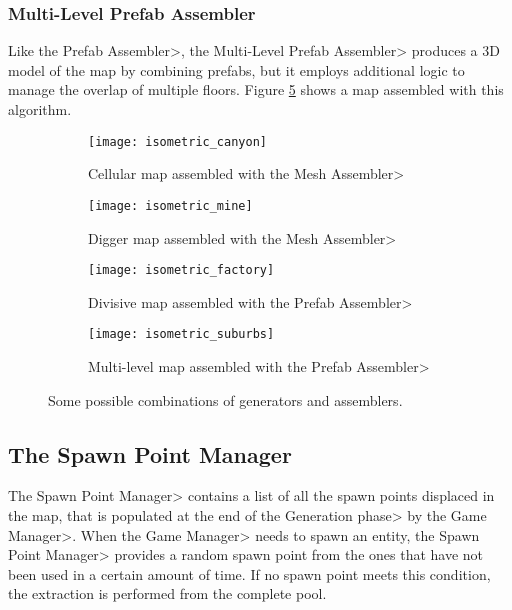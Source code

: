 
\subsubsection{Multi-Level Prefab Assembler}

Like the \<Prefab Assembler>, the \<Multi-Level Prefab Assembler> produces a 3D model of the map by combining prefabs, but it employs additional logic to manage the overlap of multiple floors. Figure \ref{fig:multi_assembled} shows a map assembled with this algorithm.

\begin{figure}
\centering
\begin{subfigure}[t]{0.48\linewidth}
\texttt{[image: isometric\_canyon]}
\caption{Cellular map assembled with the \<Mesh Assembler>}
\label{fig:cellular_assembled}
\end{subfigure}
\hfill
\begin{subfigure}[t]{0.48\linewidth}
\texttt{[image: isometric\_mine]}
\caption{Digger map assembled with the \<Mesh Assembler>}
\label{fig:digger_assembled}
\end{subfigure}

\begin{subfigure}[t]{0.48\linewidth}
\texttt{[image: isometric\_factory]}
\caption{Divisive map assembled with the \<Prefab Assembler>}
\label{fig:divisive_assembled}
\end{subfigure}
\hfill
\begin{subfigure}[t]{0.48\linewidth}
\texttt{[image: isometric\_suburbs]}
\caption{Multi-level map assembled with the \<Prefab Assembler>}
\label{fig:multi_assembled}
\end{subfigure}
\caption{Some possible combinations of generators and assemblers.}
\end{figure}


\subsection{The Spawn Point Manager}

The \<Spawn Point Manager> contains a list of all the spawn points displaced in the map, that is populated at the end of the \<Generation phase> by the \<Game Manager>. When the \<Game Manager> needs to spawn an entity, the \<Spawn Point Manager> provides a random spawn point from the ones that have not been used in a certain amount of time. If no spawn point meets this condition, the extraction is performed from the complete pool.

